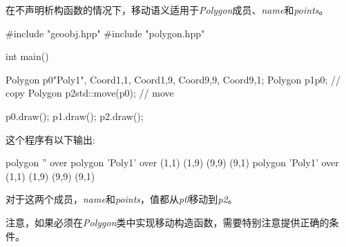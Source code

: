 在不声明析构函数的情况下，移动语义适用于\textit{Polygon}成员、\textit{name}和\textit{points}。

\begin{cppcode}
#include "geoobj.hpp"
#include "polygon.hpp"

int main()
{
	Polygon p0{"Poly1", {Coord{1,1}, Coord{1,9}, Coord{9,9}, Coord{9,1}}};
	Polygon p1{p0}; // copy
	Polygon p2{std::move(p0)}; // move

	p0.draw();
	p1.draw();
	p2.draw();
}
\end{cppcode}

这个程序有以下输出:

\begin{outputcode}
polygon '' over
polygon 'Poly1' over (1,1) (1,9) (9,9) (9,1)
polygon 'Poly1' over (1,1) (1,9) (9,9) (9,1)
\end{outputcode}

对于这两个成员，\textit{name}和\textit{points}，值都从\textit{p0}移动到\textit{p2}。

注意，如果必须在\textit{Polygon}类中实现移动构造函数，需要特别注意提供正确的条件。



























































